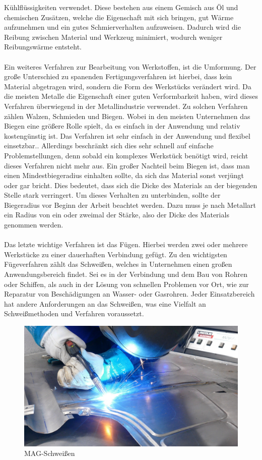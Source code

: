 Kühlflüssigkeiten verwendet. Diese bestehen aus einem Gemisch aus Öl und chemischen Zusätzen, welche die Eigenschaft mit sich bringen, gut Wärme 
aufzunehmen und ein gutes Schmierverhalten aufzuweisen. Dadurch wird die Reibung zwischen Material und Werkzeug minimiert, wodurch weniger Reibungswärme
entsteht. \autocite{Dietrich.2020} 
\\\\
Ein weiteres Verfahren zur Bearbeitung von Werkstoffen, ist die Umformung. Der große Unterschied zu spanenden Fertigungsverfahren ist hierbei, dass kein 
Material abgetragen wird, sondern die Form des Werkstücks verändert wird. Da die meisten Metalle die Eigenschaft einer guten Verformbarkeit haben, wird 
dieses Verfahren überwiegend in der Metallindustrie verwendet. Zu solchen Verfahren zählen \zB Walzen, Schmieden und Biegen. Wobei in den meisten Unternehmen 
das Biegen eine größere Rolle spielt, da es einfach in der Anwendung und relativ kostengünstig ist. Das Verfahren ist sehr einfach in der Anwendung und 
flexibel einsetzbar.. Allerdings beschränkt sich dies sehr schnell auf einfache Problemstellungen, denn sobald ein komplexes Werkstück benötigt wird, reicht 
dieses Verfahren nicht mehr aus. Ein großer Nachteil beim Biegen ist, dass man einen Mindestbiegeradius einhalten sollte, da sich das Material sonst verjüngt 
oder gar bricht. Dies bedeutet, dass sich die Dicke des Materials an der biegenden Stelle stark verringert. 
Um dieses Verhalten zu unterbinden, sollte der Biegeradius vor Beginn der Arbeit beachtet werden. Dazu muss je nach Metallart ein Radius von ein oder zweimal
der Stärke, also der Dicke des Materials genommen werden. \autocite{Arendes.2023}
\\\\
Das letzte wichtige Verfahren ist das Fügen. Hierbei werden zwei oder mehrere Werkstücke zu einer dauerhaften Verbindung gefügt. Zu den wichtigsten 
Fügeverfahren zählt das Schweißen, welches in Unternehmen einen großen Anwendungsbereich findet. Sei es in der Verbindung und dem Bau von Rohren oder 
Schiffen, als auch in der Lösung von schnellen Problemen vor Ort, wie \zB zur Reparatur von Beschädigungen an Wasser- oder Gasrohren. Jeder Einsatzbereich 
hat andere Anforderungen an das Schweißen, was eine Vielfalt an Schweißmethoden und Verfahren voraussetzt. 
\begin{figure}[hbt]
    \centering
    \includegraphics[width=0.98\linewidth]{images/MAG}
    \caption[MAG-Schweißen]{MAG-Schweißen \autocite{MAG}}
    \label{fig:MAG-Schweißen}
\end{figure}
